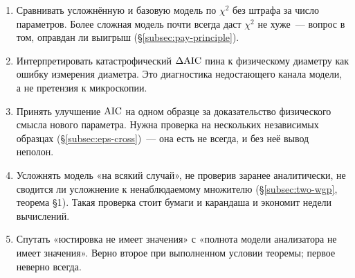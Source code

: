\begin{enumerate}[leftmargin=1.6em,itemsep=0.25em]
  \item Сравнивать усложнённую и базовую модель по $\chi^2$ без штрафа за число параметров. Более
        сложная модель почти всегда даст $\chi^2$ не хуже~--- вопрос в том, оправдан ли выигрыш
        (§\ref{subsec:pay-principle}).
  \item Интерпретировать катастрофический $\Delta\mathrm{AIC}$ пина к физическому диаметру как ошибку
        измерения диаметра. Это диагностика недостающего канала модели, а не претензия к
        микроскопии.
  \item Принять улучшение $\operatorname{AIC}$ на одном образце за доказательство физического смысла нового
        параметра. Нужна проверка на нескольких независимых образцах
        (§\ref{subsec:eps-cross})~--- она есть не всегда, и без неё вывод неполон.
  \item Усложнять модель «на всякий случай», не проверив заранее аналитически, не сводится ли
        усложнение к ненаблюдаемому множителю (§\ref{subsec:two-wgp}, теорема §1). Такая проверка
        стоит бумаги и карандаша и экономит недели вычислений.
  \item Спутать «юстировка не имеет значения» с «полнота модели анализатора не имеет значения».
        Верно второе при выполненном условии теоремы; первое неверно всегда.
\end{enumerate}

\clearpage
